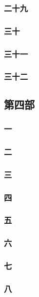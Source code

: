 \subsubsection*{二十九}
\subsubsection*{三十}
\subsubsection*{三十一}
\subsubsection*{三十二}







\subsection*{第四部}



\subsubsection*{一}
\subsubsection*{二}
\subsubsection*{三}
\subsubsection*{四}
\subsubsection*{五}
\subsubsection*{六}
\subsubsection*{七}
\subsubsection*{八}
